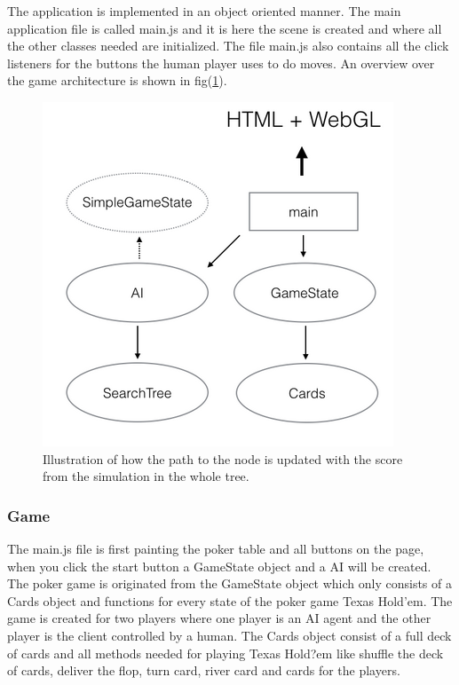 \documentclass[journal]{vgtc}                %
\begin{document}
The application is implemented in an object oriented manner. The main application file is called main.js and it is here the scene is created and where all the other classes needed are initialized. The file main.js also contains all the click listeners for the buttons the human player uses to do moves. An overview over the game architecture is shown in fig(\ref{fig:arcitect}). 
\begin{figure}[here]
  \begin{center}
    \includegraphics[scale=0.50]{img/arcitect.png}
    \caption{\label{fig:arcitect} Illustration of how the path to the node is updated with the score from the simulation in the whole tree.}
  \end{center}
\end{figure}

\subsubsection{Game}
The main.js file is first painting the poker table and all buttons on the page, when you click the start button a GameState object and a AI will be created.
The poker game is originated from the GameState object which only consists of a Cards object and functions for every state of the poker game Texas Hold'em. The game is created for two players where one player is an AI agent and the other player is the client controlled by a human. The Cards object consist of a full deck of cards and all methods needed for playing Texas Hold?em like shuffle the deck of cards, deliver the flop, turn card, river card and cards for the players.
\end{document}
